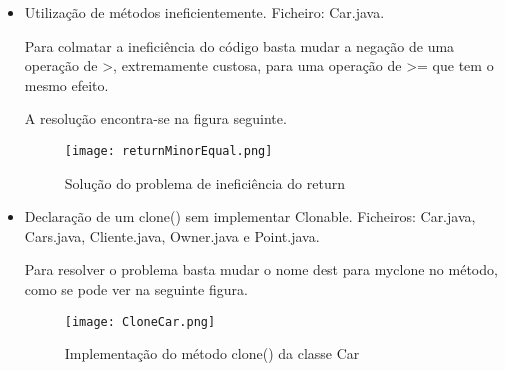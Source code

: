 \begin{itemize}
\item Utilização de métodos ineficientemente.\newline
 Ficheiro: Car.java.\newline


\par Para colmatar a ineficiência do código basta mudar a negação de uma operação de >, extremamente custosa, para uma operação de >= que tem o mesmo efeito.\newline
\par A resolução encontra-se na figura seguinte. 
\begin{figure}[H]

  \centering

  \texttt{[image: returnMinorEqual.png]}

  \caption {Solução do problema de ineficiência do return}

  \label {fig20}

\end{figure}

\end{itemize}

\begin{itemize}
\item Declaração de um clone() sem implementar Clonable.\newline
 Ficheiros: Car.java, Cars.java, Cliente.java, Owner.java e Point.java.\newline


\par Para resolver o problema basta mudar o nome dest para myclone no método, como se pode ver na seguinte figura.\newline

\begin{figure}[H]

  \centering

  \texttt{[image: CloneCar.png]}


  \caption {Implementação do método clone() da classe Car}

  \label {fig21}

\end{figure}

\end{itemize}


